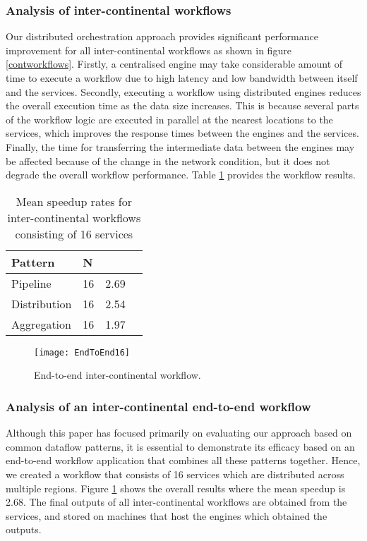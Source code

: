 \documentclass[10pt, conference, compsocconf]{IEEEtran}
\begin{document}
\subsubsection{Analysis of inter-continental workflows}

Our distributed orchestration approach provides significant performance improvement for all inter-continental workflows as shown in figure \ref{contworkflows}.
Firstly, a centralised engine may take considerable amount of time to execute a workflow due to high latency and low bandwidth between itself and the services.
Secondly, executing a workflow using distributed engines reduces the overall execution time as the data size increases.
This is because several parts of the workflow logic are executed in parallel at the nearest locations to the services, which improves the response times between the engines and the services.
Finally, the time for transferring the intermediate data between the engines may be affected because of the change in the network condition, but it does not degrade the overall workflow performance.
Table \ref{table3} provides the workflow results.

\begin{table}[h]\normalsize
\caption{Mean speedup rates for inter-continental workflows consisting of 16 services}
\label{table3}
\begin{center}
\begin{tabular}{| l | l | l | l |}
\hline
Pattern & N & \\ \hline
Pipeline& 16& 2.69\\ \hline
Distribution& 16&2.54\\ \hline
Aggregation& 16& 1.97\\ \hline
\end{tabular}
\end{center}
\end{table}

\begin{figure}[!hb]
\centerline{\texttt{[image: EndToEnd16]}}
\caption{End-to-end inter-continental workflow.}
\label{endtoendworkflow}
\end{figure}
\subsubsection{Analysis of an inter-continental end-to-end workflow}
Although this paper has focused primarily on evaluating our approach based on common dataflow patterns, it is essential to demonstrate its efficacy based on an end-to-end workflow application that combines all these patterns together.
Hence, we created a workflow that consists of 16 services which are distributed across multiple regions.
Figure \ref{endtoendworkflow} shows the overall results where the mean speedup is 2.68.
The final outputs of all inter-continental workflows are obtained from the services, and stored on machines that host the engines which obtained the outputs.
\end{document}
